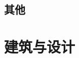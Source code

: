 \documentclass[UTF8]{ApplicationUniverse}
\begin{document}
\section{其他}


\chapter{建筑与设计}
\end{document}
